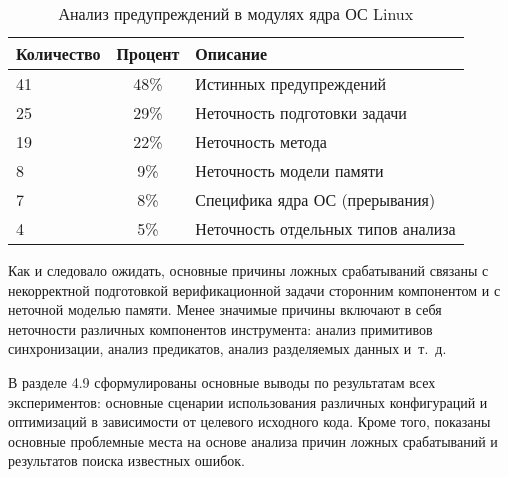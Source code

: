 \begin{table}[h] \footnotesize \centering
    \caption{Анализ предупреждений в модулях ядра ОС Linux}
  	\label{table-unsafes}
    \begin{tabular}{ | l | c | l |}
      \hline
      Количество &	Процент    	& Описание \\ \hline
      41		&	48\%     	& Истинных предупреждений	\\ 
      25		&	29\%     	& Неточность подготовки задачи	\\ 
      19		&	22\%     	& Неточность метода	\\ \hline
      \hspace{1cm}8   &	9\%     	& Неточность модели памяти	\\ 
      \hspace{1cm}7	  &	8\%     	& Специфика ядра ОС (прерывания)  \\
      \hspace{1cm}4	  &	5\%     	& Неточность отдельных типов анализа 	\\ 
      \hline
    \end{tabular}
  \end{table}

Как и следовало ожидать, основные причины ложных срабатываний связаны с некорректной подготовкой верификационной задачи сторонним компонентом и с неточной моделью памяти.
Менее значимые причины включают в себя неточности различных компонентов инструмента: анализ примитивов синхронизации, анализ предикатов, анализ разделяемых данных и~т.~д.

В разделе 4.9 сформулированы основные выводы по результатам всех экспериментов: основные сценарии использования различных конфигураций и оптимизаций в зависимости от целевого исходного кода.
Кроме того, показаны основные проблемные места на основе анализа причин ложных срабатываний и результатов поиска известных ошибок.

%

